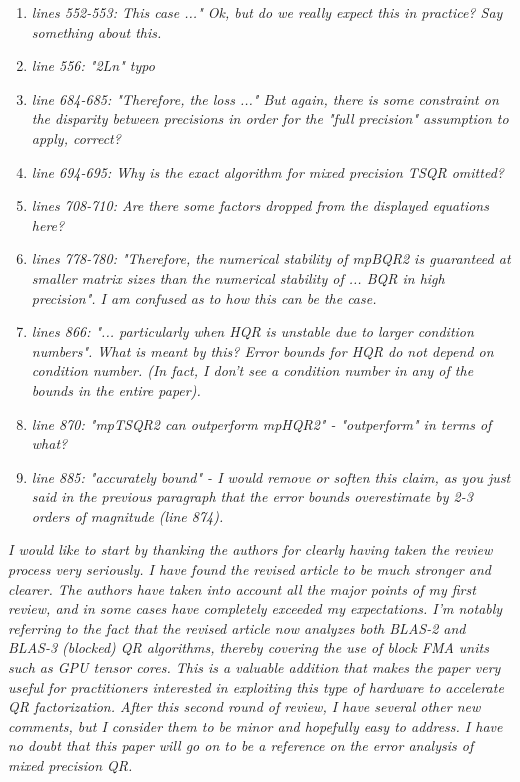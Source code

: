 \documentclass[final,onefignum,onetabnum]{siamart190516}
\begin{document}
\begin{enumerate}
    \item {\it lines 552-553: This case ..." Ok, but do we really expect this in practice? Say something about this. }
    \item {\it line 556: "2Ln" typo }
    \item {\it line 684-685: "Therefore, the loss ..." But again, there is some constraint on the disparity between precisions in order for the "full precision" assumption to apply, correct? }
    \item {\it line 694-695: Why is the exact algorithm for mixed precision TSQR omitted? }
    \item {\it lines 708-710: Are there some factors dropped from the displayed equations here? }
    \item {\it lines 778-780: "Therefore, the numerical stability of mpBQR2 is guaranteed at smaller matrix sizes than the numerical stability of ... BQR in high precision". I am confused as to how this can be the case. }
    \item {\it lines 866: "... particularly when HQR is unstable due to larger condition numbers". What is meant by this? Error bounds for HQR do not depend on condition number. (In fact, I don't see a condition number in any of the bounds in the entire paper). }
    \item {\it line 870: "mpTSQR2 can outperform mpHQR2" - "outperform" in terms of what? }
    \item {\it line 885: "accurately bound" - I would remove or soften this claim, as you just said in the previous paragraph that the error bounds overestimate by 2-3 orders of magnitude (line 874).}
\end{enumerate}

{\it I would like to start by thanking the authors for clearly having taken the review process very seriously. I have found the revised article to be much stronger and clearer. The authors have taken into account all the major points of my first review, and in some cases have completely exceeded my expectations. I’m notably referring to the fact that the revised article now analyzes both BLAS-2 and BLAS-3 (blocked) QR algorithms, thereby covering the use of block FMA units such as GPU tensor cores. This is a valuable addition that makes the paper very useful for practitioners interested in exploiting this type of hardware to accelerate QR factorization.
After this second round of review, I have several other new comments, but I consider them to be minor and hopefully easy to address. I have no doubt that this paper will go on to be a reference on the error analysis of mixed precision QR.}
\end{document}
